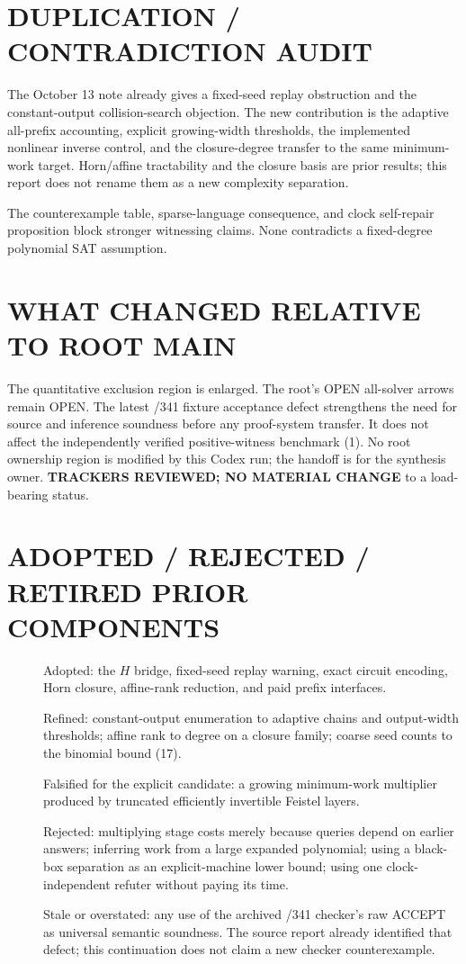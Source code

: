 \documentclass[11pt]{article}
\begin{document}
\section*{DUPLICATION / CONTRADICTION AUDIT}
The October 13 note already gives a fixed-seed replay obstruction and
the constant-output collision-search objection. The new contribution
is the adaptive all-prefix accounting, explicit growing-width thresholds,
the implemented nonlinear inverse control, and the closure-degree
transfer to the same minimum-work target.
Horn/affine tractability and the closure basis are prior results;
this report does not rename them as a new complexity separation.

The counterexample table, sparse-language consequence, and clock
self-repair proposition block stronger witnessing claims. None
contradicts a fixed-degree polynomial SAT assumption.

\section*{WHAT CHANGED RELATIVE TO ROOT MAIN}
The quantitative exclusion region is enlarged.
The root's OPEN all-solver arrows remain OPEN.
The latest /341 fixture acceptance defect strengthens the need for
source and inference soundness before any proof-system transfer.
It does not affect the independently verified positive-witness
benchmark (1). No root ownership region is modified by this Codex run;
the handoff is for the synthesis owner.
\textbf{TRACKERS REVIEWED; NO MATERIAL CHANGE} to a load-bearing status.

\section*{ADOPTED / REJECTED / RETIRED PRIOR COMPONENTS}
\begin{description}
\item[] Adopted: the $H$ bridge, fixed-seed replay warning, exact circuit
encoding, Horn closure, affine-rank reduction, and paid prefix interfaces.
\item[] Refined: constant-output enumeration to adaptive chains and
output-width thresholds; affine rank to degree on a closure family;
coarse seed counts to the binomial bound (17).
\item[] Falsified for the explicit candidate: a growing minimum-work
multiplier produced by truncated efficiently invertible Feistel layers.
\item[] Rejected: multiplying stage costs merely because queries depend
on earlier answers; inferring work from a large expanded polynomial;
using a black-box separation as an explicit-machine lower bound;
using one clock-independent refuter without paying its time.
\item[] Stale or overstated: any use of the archived /341 checker's
raw ACCEPT as universal semantic soundness. The source report already
identified that defect; this continuation does not claim a new checker
counterexample.
\end{description}
\end{document}
